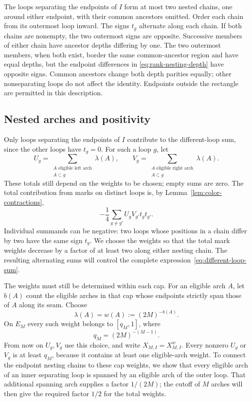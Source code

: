 The loops separating the endpoints of $I$ form at most two nested
chains, one around either endpoint, with their common ancestors
omitted.  Order each chain from its outermost loop inward.  The signs
$t_g$ alternate along each chain.  If both chains are nonempty, the
two outermost signs are opposite.  Successive members of either chain
have ancestor depths differing by one.  The two outermost members, when
both exist, border the same common-ancestor region and have equal
depths, but the endpoint differences in
\eqref{eq:rank-nesting-depth} have opposite signs.  Common ancestors
change both depth parities equally; other nonseparating loops do not
affect the identity.  Endpoints outside the rectangle are permitted in
this description.

\subsection{Nested arches and positivity}

Only loops separating the endpoints of $I$ contribute to the
different-loop sum, since the other loops have $t_g=0$.  For such a
loop $g$, let
\[
 U_g=\sum_{\substack{A\text{ eligible left arch}\\A\subset g}}\lambda(A),
 \qquad
 V_g=\sum_{\substack{A\text{ eligible right arch}\\A\subset g}}\lambda(A).
\]
These totals still depend on the weights to be chosen; empty sums are
zero.  The total contribution from marks on distinct
loops is, by Lemma~\ref{lem:color-contractions},
\begin{equation}
 -\frac14\sum_{g\ne g'}U_gV_{g'}t_gt_{g'}.
 \label{eq:different-loop-sum}
\end{equation}
Individual summands can be negative: two loops whose positions in a
chain differ by two have the same sign $t_g$.  We choose the weights
so that the total mark weights decrease by a factor of at least two
along either nesting chain.  The resulting alternating sums will
control the complete expression~\eqref{eq:different-loop-sum}.

The weights must still be determined within each cap.  For an eligible
arch $A$, let $b(A)$ count the eligible arches in that cap whose
endpoints strictly span those of $A$ along its seam.  Choose
\begin{equation}
 \lambda(A)=w(A):=(2M)^{-b(A)}.
 \label{eq:arch-weight}
\end{equation}
On $E_M$ every such weight belongs to $[q_M,1]$, where
\begin{equation}
 q_M=(2M)^{-(M-1)}.
 \label{eq:minimum-arch-weight}
\end{equation}
From now on $U_g,V_g$ use this choice, and write
$X_{M,I}=X^w_{M,I}$.  Every nonzero $U_g$ or $V_g$ is at least $q_M$,
because it contains at least one eligible-arch weight.
To connect the endpoint nesting chains to these
cap weights, we show that every eligible arch of an inner separating
loop is spanned by an eligible arch of the outer loop.  That additional
spanning arch supplies a factor $1/(2M)$; the cutoff of $M$ arches will
then give the required factor $1/2$ for the total weights.

